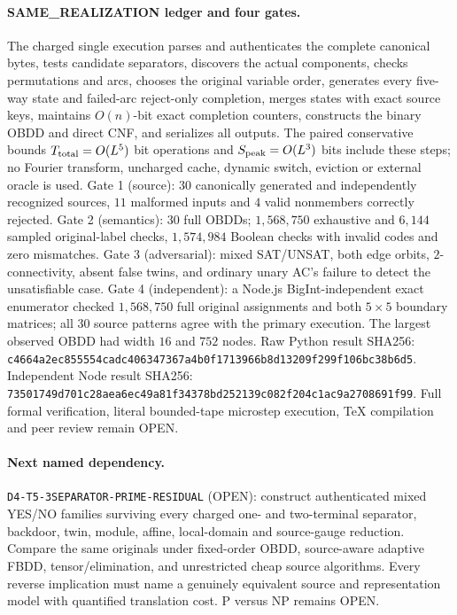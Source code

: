 \documentclass[11pt]{article}
\begin{document}
\paragraph{SAME\_REALIZATION ledger and four gates.}
The charged single execution parses and authenticates the complete
canonical bytes, tests candidate separators, discovers the actual
components, checks permutations and arcs, chooses the original
variable order, generates every five-way state and failed-arc
reject-only completion, merges states with exact source keys,
maintains $O(n)$-bit exact completion counters, constructs the
binary OBDD and direct CNF, and serializes all outputs.
The paired conservative bounds $T_{\rm total}=O(L^5)$ bit
operations and $S_{\rm peak}=O(L^3)$ bits include these steps;
no Fourier transform, uncharged cache, dynamic switch, eviction
or external oracle is used.
Gate 1 (source): $30$ canonically generated and independently
recognized sources, $11$ malformed inputs and $4$ valid nonmembers
correctly rejected. Gate 2 (semantics): $30$ full OBDDs;
$1{,}568{,}750$ exhaustive and $6{,}144$ sampled original-label
checks, $1{,}574{,}984$ Boolean checks with invalid codes
and zero mismatches. Gate 3 (adversarial): mixed SAT/UNSAT,
both edge orbits, $2$-connectivity, absent false twins, and
ordinary unary AC's failure to detect the unsatisfiable case.
Gate 4 (independent): a Node.js BigInt-independent exact
enumerator checked $1{,}568{,}750$ full original assignments
and both $5\times5$ boundary matrices; all $30$ source
patterns agree with the primary execution.
The largest observed OBDD had width $16$ and $752$ nodes.
Raw Python result SHA256:
\texttt{c4664a2ec855554cadc406347367a4b0f1713966b8d13209f299f106bc38b6d5}.
Independent Node result SHA256:
\texttt{73501749d701c28aea6ec49a81f34378bd252139c082f204c1ac9a2708691f99}.
Full formal verification, literal bounded-tape microstep
execution, TeX compilation and peer review remain OPEN.

\paragraph{Next named dependency.}
\texttt{D4-T5-3SEPARATOR-PRIME-RESIDUAL} (OPEN):
construct authenticated mixed YES/NO families surviving
every charged one- and two-terminal separator,
backdoor, twin, module, affine, local-domain and
source-gauge reduction. Compare the same originals
under fixed-order OBDD, source-aware adaptive FBDD,
tensor/elimination, and unrestricted cheap source
algorithms. Every reverse implication must name a genuinely
equivalent source and representation model with quantified
translation cost. P versus NP remains OPEN.
\end{document}
